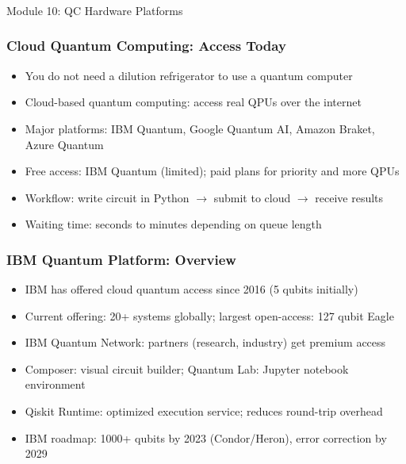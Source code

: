 
\begin{frame}[fragile]\frametitle{}
\begin{center}
{\Large Module 10: QC Hardware Platforms}
\end{center}
\end{frame}

\begin{frame}[fragile]\frametitle{Cloud Quantum Computing: Access Today}
\begin{itemize}
\item You do not need a dilution refrigerator to use a quantum computer
\item Cloud-based quantum computing: access real QPUs over the internet
\item Major platforms: IBM Quantum, Google Quantum AI, Amazon Braket, Azure Quantum
\item Free access: IBM Quantum (limited); paid plans for priority and more QPUs
\item Workflow: write circuit in Python $\to$ submit to cloud $\to$ receive results
\item Waiting time: seconds to minutes depending on queue length
\end{itemize}
\end{frame}

\begin{frame}[fragile]\frametitle{IBM Quantum Platform: Overview}
\begin{itemize}
\item IBM has offered cloud quantum access since 2016 (5 qubits initially)
\item Current offering: 20+ systems globally; largest open-access: 127 qubit Eagle
\item IBM Quantum Network: partners (research, industry) get premium access
\item Composer: visual circuit builder; Quantum Lab: Jupyter notebook environment
\item Qiskit Runtime: optimized execution service; reduces round-trip overhead
\item IBM roadmap: 1000+ qubits by 2023 (Condor/Heron), error correction by 2029
\end{itemize}
\end{frame}

